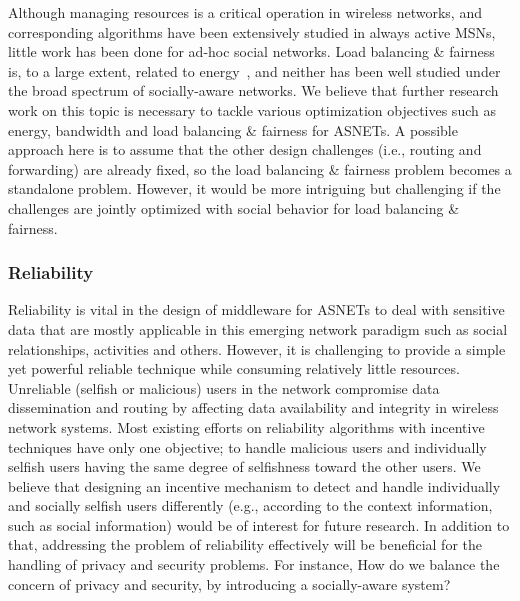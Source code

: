 Although managing resources is a critical operation in wireless networks, and corresponding algorithms have been extensively studied in always active MSNs, little work has been done for ad-hoc social networks. Load balancing \& fairness is, to a large extent, related to energy~\cite{SManfredi2013}, and neither has been well studied under the broad spectrum of socially-aware networks. We believe that further research work on this topic is necessary to tackle various optimization objectives such as energy, bandwidth and load balancing \& fairness for ASNETs. A possible approach here is to assume that the other design challenges (i.e., routing and forwarding) are already fixed, so the load balancing \& fairness problem becomes a standalone problem. However, it would be more intriguing but challenging if the challenges are jointly optimized with social behavior for load balancing \& fairness.

\subsubsection{Reliability}\label{Chap3_02_05_04}
Reliability is vital in the design of middleware for ASNETs to deal with sensitive data that are mostly applicable in this emerging network paradigm such as social relationships, activities and others. However, it is challenging to provide a simple yet powerful reliable technique while consuming relatively little resources. Unreliable (selfish or malicious) users in the network compromise data dissemination and routing by affecting data availability and integrity in wireless network systems. Most existing efforts on reliability algorithms with incentive techniques have only one objective; to handle malicious users and individually selfish users having the same degree of selfishness toward the other users. We believe that designing an incentive mechanism to detect and handle individually and socially selfish users differently (e.g., according to the context information, such as social information) would be of interest for future research. In addition to that, addressing the problem of reliability effectively will be beneficial for the handling of privacy and security problems. For instance, How do we balance the concern of privacy and security, by introducing a socially-aware system?

